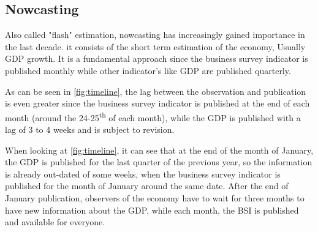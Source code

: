 \documentclass[12pt,a4paper,oneside]{book}
\begin{document}
\subsection{Nowcasting}
\label{sec:nowcasting}

Also called "flash" estimation, nowcasting has increasingly gained importance in the last decade.
it consists of the short term estimation of the economy, Usually GDP growth.
It is a fundamental approach since the business survey indicator is published monthly while other indicator's like GDP are published quarterly.

As can be seen in \autoref{fig:timeline}, 
the lag between the observation and publication is even greater since the business survey indicator is published at the end of each month (around the 24-25\textsuperscript{th} of each month), while the GDP is published with a lag of 3 to 4 weeks and is subject to revision.

When looking at \autoref{fig:timeline}, it can see that at the end of the month of January, the GDP is published for the last quarter of the previous year, so the information is already out-dated of some weeks, when the business survey indicator is published for the month of January around the same date. After the end of January publication, observers of the economy have to wait for three months to have new information about the GDP, while each month, the BSI is published and available for everyone.
\end{document}
